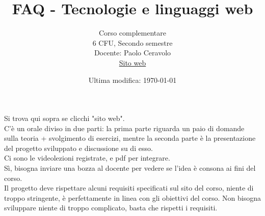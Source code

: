 \documentclass{article}
\title{FAQ - \textbf{Tecnologie e linguaggi web}}
\date{Ultima modifica:  \today}
\author{Corso complementare\\6 CFU, Secondo semestre\\
Docente: Paolo Ceravolo\\ 
\href{https://pceravolopwm.ariel.ctu.unimi.it/v5/home/Default.aspx}{Sito web}}
\begin{document}
 
\maketitle

\begin{enumerate}

\rmfamily
{} 
Si trova qui sopra se clicchi "sito web".\\
	
C'è un orale diviso in due parti: la prima parte riguarda un paio di domande sulla teoria + svolgimento di esercizi, mentre la seconda parte
è la presentazione del progetto sviluppato e discussione su di esso.\\

Ci sono le videolezioni registrate, e pdf per integrare. \\

Sì, bisogna inviare una bozza al docente per vedere se l'idea è consona ai fini del corso.\\

Il progetto deve rispettare alcuni requisiti specificati sul sito del corso, niente di troppo stringente, è perfettamente in linea con gli obiettivi del corso. Non bisogna sviluppare niente di troppo complicato, basta che rispetti i requisiti.
 
\end{enumerate}
\end{document}
